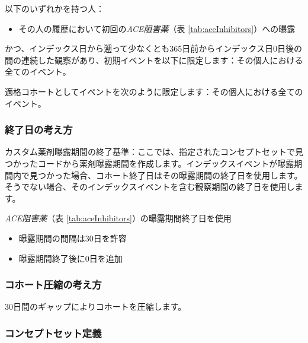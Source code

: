 \documentclass[
  11pt]{book}
\providecommand{\tightlist}{%
  \setlength{\itemsep}{0pt}\setlength{\parskip}{0pt}}
\theoremstyle{definition}
\theoremstyle{definition}
\theoremstyle{definition}
\theoremstyle{definition}
\theoremstyle{remark}
\begin{document}
以下のいずれかを持つ人：

\begin{itemize}
\tightlist
\item
  その人の履歴において初回の\emph{ACE阻害薬}（表 \ref{tab:aceInhibitors}）への曝露
\end{itemize}

かつ、インデックス日から遡って少なくとも365日前からインデックス日0日後の間の連続した観察があり、初期イベントを以下に限定します：その個人における全てのイベント。

適格コホートとしてイベントを次のように限定します：その個人における全てのイベント。

\subsubsection*{終了日の考え方}\label{ux7d42ux4e86ux65e5ux306eux8003ux3048ux65b9}

カスタム薬剤曝露期間の終了基準：ここでは、指定されたコンセプトセットで見つかったコードから薬剤曝露期間を作成します。インデックスイベントが曝露期間内で見つかった場合、コホート終了日はその曝露期間の終了日を使用します。そうでない場合、そのインデックスイベントを含む観察期間の終了日を使用します。

\emph{ACE阻害薬}（表 \ref{tab:aceInhibitors}）の曝露期間終了日を使用

\begin{itemize}
\tightlist
\item
  曝露期間の間隔は30日を許容
\item
  曝露期間終了後に0日を追加
\end{itemize}

\subsubsection*{コホート圧縮の考え方}\label{ux30b3ux30dbux30fcux30c8ux5727ux7e2eux306eux8003ux3048ux65b9}

30日間のギャップによりコホートを圧縮します。

\subsubsection*{コンセプトセット定義}\label{ux30b3ux30f3ux30bbux30d7ux30c8ux30bbux30c3ux30c8ux5b9aux7fa9}
\end{document}
